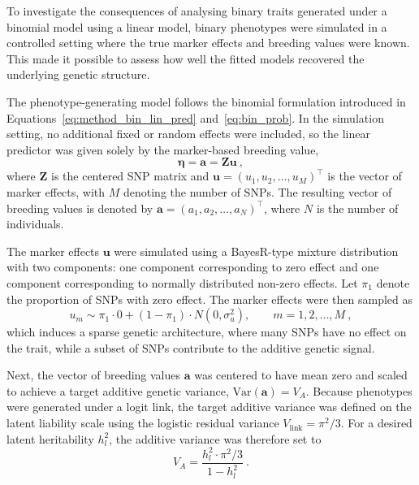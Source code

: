 To investigate the consequences of analysing binary traits generated under a binomial model using a linear model, binary phenotypes were simulated in a controlled setting where the true marker effects and breeding values were known. This made it possible to assess how well the fitted models recovered the underlying genetic structure.

The phenotype-generating model follows the binomial formulation introduced in Equations~\eqref{eq:method_bin_lin_pred} and~\eqref{eq:bin_prob}. In the simulation setting, no additional fixed or random effects were included, so the linear predictor was given solely by the marker-based breeding value,
%
\begin{equation}
\label{eq:sim_bv}
\boldsymbol{\eta} = \mathbf{a} = \mathbf{Z}\mathbf{u} \ ,
\end{equation}
%
where $\mathbf{Z}$ is the centered SNP matrix and $\mathbf{u} = (u_1, u_2, \ldots, u_M)^\top$ is the vector of marker effects, with $M$ denoting the number of SNPs. The resulting vector of breeding values is denoted by $\mathbf{a} = (a_1, a_2, \ldots, a_N)^\top$, where $N$ is the number of individuals.
%

The marker effects $\mathbf{u}$ were simulated using a BayesR-type mixture distribution with two components: one component corresponding to zero effect and one component corresponding to normally distributed non-zero effects. Let $\pi_1$ denote the proportion of SNPs with zero effect. The marker effects were then sampled as
%
\begin{equation*}
\label{eq:sim_marker_effects}
u_m \sim \pi_1 \cdot 0 + (1-\pi_1) \cdot N(0,\sigma_u^2), \qquad m = 1, 2, \dots, M \ ,
\end{equation*}
%
which induces a sparse genetic architecture, where many SNPs have no effect on the trait, while a subset of SNPs contribute to the additive genetic signal.

Next, the vector of breeding values $\mathbf{a}$ was centered to have mean zero and scaled to achieve a target additive genetic variance, $\mathrm{Var}(\mathbf{a}) = V_A$. Because phenotypes were generated under a logit link, the target additive variance was defined on the latent liability scale using the logistic residual variance $V_{\text{link}} = \pi^2/3$. For a desired latent heritability $h^2_l$, the additive variance was therefore set to
%
\begin{equation}
    V_A = \frac{h^2_l \cdot \pi^2/3}{1 - h^2_l} \ .
    \label{eq:VA_vs_heritability}
\end{equation}

